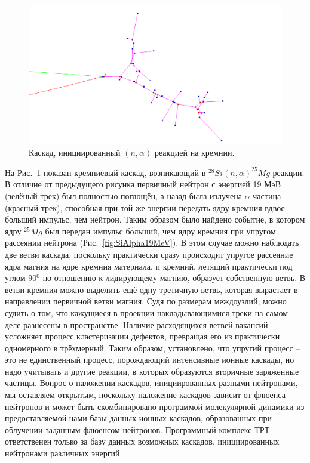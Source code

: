 \documentclass[a4paper,12pt]{article}
\begin{document}
\begin{large}
 \begin{figure}[ht]
  \centering
  \includegraphics[width=0.99\linewidth]{images/1831_0}
  \caption{Каскад, инициированный $(n,\alpha)$ реакцией на кремнии.}
  \label{fig:nSiElastic19MeV}
 \end{figure}
 
 На Рис.~\ref{fig:nSiElastic19MeV} показан кремниевый каскад, возникающий в $^{28}Si(n,\alpha)^{25}Mg$ реакции.
 В отличие от предыдущего рисунка первичный нейтрон с энергией 19 МэВ (зелёный трек) был полностью поглощён, а назад была излучена $\alpha$-частица (красный трек), способная при той же энергии передать ядру кремния вдвое больший импульс, чем нейтрон.
 Таким образом было найдено событие, в котором ядру $^{25}Mg$ был передан импульс б\'{о}льший, чем ядру кремния при упругом рассеянии нейтрона (Рис.~\ref{fig:SiAlpha19MeV}).
 В этом случае можно наблюдать две ветви каскада, поскольку практически сразу происходит упругое рассеяние ядра магния на ядре кремния материала, и кремний, летящий практически под углом 90$^0$ по отношению к лидирующему магнию, образует собственную ветвь.
 В ветви кремния можно выделить ещё одну третичную ветвь, которая вырастает в направлении первичной ветви магния.
 Судя по размерам междоузлий, можно судить о том, что кажущиеся в проекции накладывающимися треки на самом деле разнесены в пространстве.
 Наличие расходящихся ветвей вакансий усложняет процесс кластеризации дефектов, превращая его из практически одномерного в трёхмерный.
 Таким образом, установлено, что упругий процесс -- это не единственный процесс, порождающий интенсивные ионные каскады, но надо учитывать и другие реакции, в которых образуются вторичные заряженные частицы.
 Вопрос о наложении каскадов, инициированных разными нейтронами, мы оставляем открытым, поскольку наложение каскадов зависит от флюенса нейтронов и может быть скомбинировано программой молекулярной динамики из предоставляемой нами базы данных ионных каскадов, образованных при облучении заданным флюенсом нейтронов.
 Программный комплекс ТРТ ответственен только за базу данных возможных каскадов, инициированных нейтронами различных энергий.


\end{large}
\end{document}
